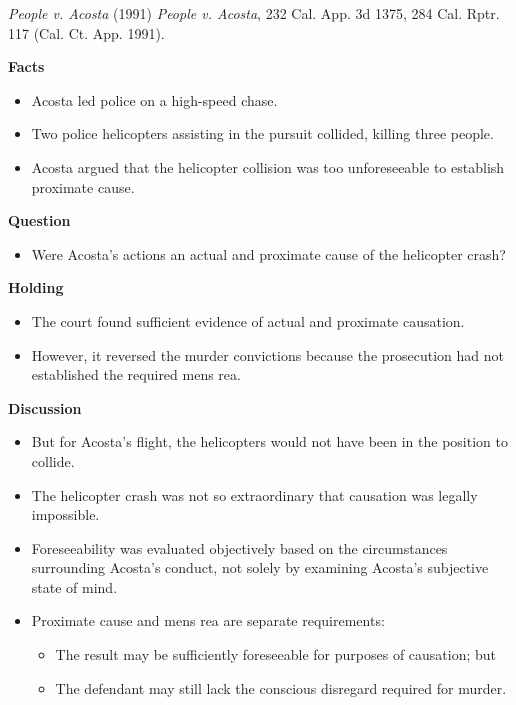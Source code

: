 \documentclass[11pt]{tex/lawoutline}
\begin{document}
\casebox
{\textit{People v. Acosta} (1991)}
{\textit{People v. Acosta}, 232 Cal. App. 3d 1375, 284 Cal. Rptr. 117 (Cal. Ct. App. 1991).}
{
\textbf{Facts}
\begin{itemize}
    \item Acosta led police on a high-speed chase.
    \item Two police helicopters assisting in the pursuit collided, killing three people.
    \item Acosta argued that the helicopter collision was too unforeseeable to establish proximate cause.
\end{itemize}

\textbf{Question}
\begin{itemize}
    \item Were Acosta's actions an actual and proximate cause of the helicopter crash?
\end{itemize}

\textbf{Holding}
\begin{itemize}
    \item The court found sufficient evidence of actual and proximate causation.
    \item However, it reversed the murder convictions because the prosecution had not established the required mens rea.
\end{itemize}

\textbf{Discussion}
\begin{itemize}
    \item But for Acosta's flight, the helicopters would not have been in the position to collide.
    \item The helicopter crash was not so extraordinary that causation was legally impossible.
    \item Foreseeability was evaluated objectively based on the circumstances surrounding Acosta's conduct, not solely by examining Acosta's subjective state of mind.
    \item Proximate cause and mens rea are separate requirements:
    \begin{itemize}
        \item The result may be sufficiently foreseeable for purposes of causation; but
        \item The defendant may still lack the conscious disregard required for murder.
    \end{itemize}
\end{itemize}
}

\end{document}
